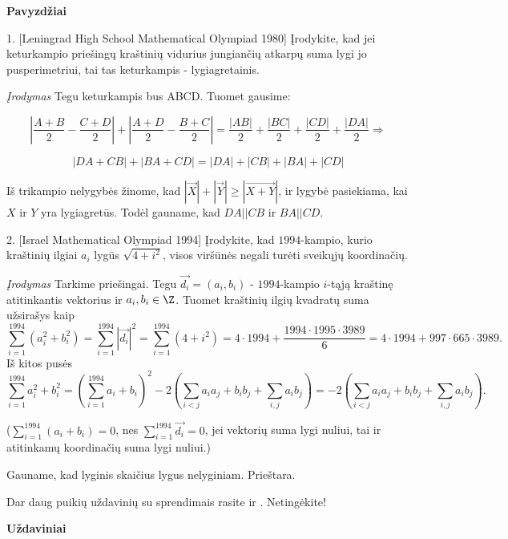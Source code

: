 \begin{center}\textbf{Pavyzdžiai}\end{center}

1. [Leningrad High School Mathematical Olympiad 1980] Įrodykite, kad jei keturkampio priešingų kraštinių vidurius jungiančių atkarpų suma lygi jo pusperimetriui, tai tas keturkampis - lygiagretainis.

{\it Įrodymas} Tegu keturkampis bus ABCD. Tuomet gausime:

$$|\frac{A+B}{2}- \frac{C+D}{2}| + |\frac{A+D}{2} - \frac{B+C}{2}| = \frac{|AB|}{2} + \frac{|BC|}{2} + \frac{|CD|}{2} + \frac{|DA|}{2} \Rightarrow$$

$$|DA + CB| + |BA + CD| = |DA| + |CB| + |BA| + |CD| $$

Iš trikampio nelygybės žinome, kad $|\vec{X}| + |\vec{Y}| \geq |\vec{X+Y}|$, ir lygybė pasiekiama, kai $X$ ir $Y$ yra lygiagretūs. Todėl gauname, kad $DA||CB$ ir $BA||CD$.

\medskip

2. [Israel Mathematical Olympiad 1994] Įrodykite, kad $1994$-kampio, kurio kraštinių ilgiai $a_i$ lygūs $\sqrt{4+i^2}$, visos viršūnės negali turėti sveikųjų koordinačių.

{\it Įrodymas} Tarkime priešingai. Tegu $\vec{d_i}=(a_i,b_i)$ - $1994$-kampio $i$-tąją kraštinę atitinkantis vektorius ir $a_i,b_i \in \Z$. Tuomet kraštinių ilgių kvadratų suma užsirašys kaip $$\sum_{i=1}^{1994} (a_i^2 + b_i^2) = \sum_{i=1}^{1994} |\vec{d_i}|^2 = \sum_{i=1}^{1994} (4 + i^2) = 4\cdot 1994 + \frac{1994\cdot 1995\cdot 3989}{6} = 4\cdot1994 + 997\cdot 665 \cdot3989.$$
Iš kitos pusės $$\sum_{i=1}^{1994} a_i^2 + b_i^2 = (\sum_{i=1}^{1994} a_i + b_i)^2 - 2(\sum_{i< j} a_ia_j + b_ib_j + \sum_{i,j}a_ib_j) = - 2(\sum_{i< j} a_ia_j + b_ib_j + \sum_{i,j}a_ib_j).$$

($\sum_{i=1}^{1994} (a_i + b_i) = 0$, nes $\sum_{i=1}^{1994} \vec{d_i} = 0$, jei vektorių suma lygi nuliui, tai ir atitinkamų koordinačių suma lygi nuliui.)

Gauname, kad lyginis skaičius lygus nelyginiam. Prieštara.

\smallskip Dar daug puikių uždavinių su sprendimais rasite \cite{ex} ir \cite{pl}. Netingėkite!

\newpage

\begin{center}\textbf{Uždaviniai}\end{center}

